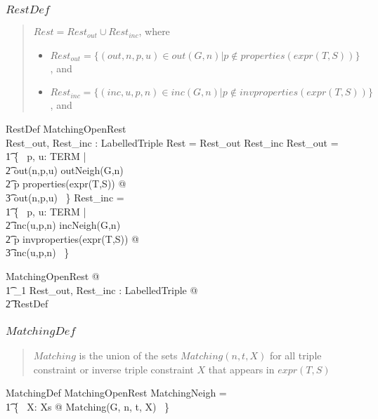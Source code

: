 \documentclass{article}
\begin{document}
\subsubsection{$RestDef$}
\begin{quote}
$Rest = Rest_{out} \cup Rest_{inc}$, where 
\begin{itemize}
\item $Rest_{out} = \{(out, n, p, u) \in out(G, n) | p \notin properties(expr(T, S))\}$, and 
\item $Rest_{inc} = \{(inc, u, p, n) \in inc(G, n) | p \notin invproperties(expr(T, S))\}$, and
\end{itemize}
\end{quote}
\begin{schema}{RestDef}
	MatchingOpenRest \\
	Rest\_out, Rest\_inc : \finset LabelledTriple
\where
	Rest = Rest\_out \cup Rest\_inc
\also
	Rest\_out = \\
\t1		\{~ p, u: TERM | \\
\t2			out(n,p,u) \in outNeigh(G,n) \land \\
\t2			p \notin properties(expr(T,S)) @ \\
\t3				out(n,p,u) ~\}
\also
	Rest\_inc = \\
\t1		\{~ p, u: TERM | \\
\t2			inc(u,p,n) \in incNeigh(G,n) \land \\
\t2			p \notin invproperties(expr(T,S)) @\\
\t3				inc(u,p,n) ~\}
\end{schema}

\begin{zed}
	\forall MatchingOpenRest @ \\
\t1		\exists_1 Rest\_out, Rest\_inc : \finset LabelledTriple @ \\
\t2			RestDef
\end{zed}

\subsubsection{$MatchingDef$}
\begin{quote}
$Matching$ is the union of the sets $Matching(n, t, X)$ for all triple constraint or inverse triple constraint $X$ that appears in $expr(T, S)$
\end{quote}
\begin{schema}{MatchingDef}
	MatchingOpenRest 
\where
	MatchingNeigh = \\
\t1		\bigcup \{~ X:  Xs @ Matching(G, n, t, X) ~\}
\end{schema}
\end{document}
